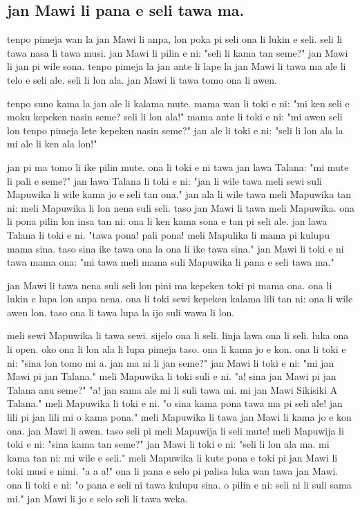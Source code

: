 \newpage
\subsection{jan Mawi li pana e seli tawa ma.}

tenpo pimeja wan la jan Mawi li anpa, lon poka pi seli ona li lukin e seli.
seli li tawa nasa li tawa musi.
jan Mawi li pilin e ni: "seli li kama tan seme?"
jan Mawi li jan pi wile sona.
tenpo pimeja la jan ante li lape la jan Mawi li tawa ma ale li telo e seli ale.
seli li lon ala.
jan Mawi li tawa tomo ona li awen.

tenpo suno kama la jan ale li kalama mute.
mama wan li toki e ni: "mi ken seli e moku kepeken nasin seme?
seli li lon ala!"
mama ante li toki e ni: "mi awen seli lon tenpo pimeja lete kepeken nasin seme?"
jan ale li toki e ni: "seli li lon ala la mi ale li ken ala lon!"

jan pi ma tomo li ike pilin mute.
ona li toki e ni tawa jan lawa Talana: "mi mute li pali e seme?"
jan lawa Talana li toki e ni: "jan li wile tawa meli sewi suli Mapuwika li wile kama jo e seli tan ona."
jan ala li wile tawa meli Mapuwika tan ni: meli Mapuwika li lon nena suli seli.
taso jan Mawi li tawa meli Mapuwika.
ona li pona pilin lon insa tan ni: ona li ken kama sona e tan pi seli ale.
jan lawa Talana li toki e ni.
"tawa pona!
pali pona!
meli Mapulika li mama pi kulupu mama sina.
taso sina ike tawa ona la ona li ike tawa sina."
jan Mawi li toki e ni tawa mama ona: "mi tawa meli mama suli Mapuwika li pana e seli tawa ma."

jan Mawi li tawa nena suli seli lon pini ma kepeken toki pi mama ona.
ona li lukin e lupa lon anpa nena.
ona li toki sewi kepeken kalama lili tan ni: ona li wile awen lon.
taso ona li tawa lupa la ijo suli wawa li lon.

meli sewi Mapuwika li tawa sewi.
sijelo ona li seli.
linja lawa ona li seli.
luka ona li open.
oko ona li lon ala li lupa pimeja taso.
ona li kama jo e kon.
ona li toki e ni: "sina lon tomo mi a.
jan ma ni li jan seme?"
jan Mawi li toki e ni: "mi jan Mawi pi jan Talana."
meli Mapuwika li toki suli e ni.
"a!
sina jan Mawi pi jan Talana anu seme?"
"a!
jan sama ale mi li suli tawa mi.
mi jan Mawi Sikisiki A Talana."
meli Mapuwika li toki e ni.
"o sina kama pona tawa ma pi seli ale!
jan lili pi jan lili mi o kama pona."
meli Mapuwika li tawa jan Mawi li kama jo e kon ona.
jan Mawi li awen.
taso seli pi meli Mapuwija li seli mute!
meli Mapuwija li toki e ni: "sina kama tan seme?"
jan Mawi li toki e ni: "seli li lon ala ma.
mi kama tan ni: mi wile e seli."
meli Mapuwika li kute pona e toki pi jan Mawi li toki musi e nimi. "a a a!"
ona li pana e selo pi palisa luka wan tawa jan Mawi.
ona li toki e ni: "o pana e seli ni tawa kulupu sina.
o pilin e ni: seli ni li suli sama mi."
jan Mawi li jo e selo seli li tawa weka.

